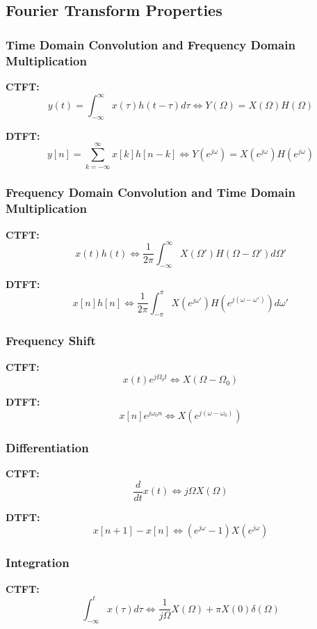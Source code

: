 \documentclass[12pt]{article}
\begin{document}
\subsection{Fourier Transform Properties}

\subsubsection{Time Domain Convolution and Frequency Domain Multiplication}

\textbf{CTFT:}
\[
y(t) = \int_{-\infty}^{\infty} x(\tau) h(t - \tau) d\tau \iff Y(\Omega) = X(\Omega) H(\Omega)
\]

\textbf{DTFT:}
\[
y[n] = \sum_{k=-\infty}^{\infty} x[k] h[n - k] \iff Y(e^{j\omega}) = X(e^{j\omega}) H(e^{j\omega})
\]

\subsubsection{Frequency Domain Convolution and Time Domain Multiplication}

\textbf{CTFT:}
\[
x(t)h(t) \iff \frac{1}{2\pi} \int_{-\infty}^{\infty} X(\Omega') H(\Omega - \Omega') d\Omega'
\]

\textbf{DTFT:}
\[
x[n]h[n] \iff \frac{1}{2\pi} \int_{-\pi}^{\pi} X(e^{j\omega'}) H(e^{j(\omega - \omega')}) d\omega'
\]

\subsubsection{Frequency Shift}

\textbf{CTFT:}
\[
x(t)e^{j \Omega_0 t} \iff X(\Omega - \Omega_0)
\]

\textbf{DTFT:}
\[
x[n]e^{j \omega_0 n} \iff X(e^{j(\omega - \omega_0)})
\]

\subsubsection{Differentiation}

\textbf{CTFT:}
\[
\frac{d}{dt}x(t) \iff j \Omega X(\Omega)
\]

\textbf{DTFT:}
\[
x[n+1] - x[n] \iff (e^{j\omega} - 1) X(e^{j\omega})
\]

\subsubsection{Integration}

\textbf{CTFT:}
\[
\int_{-\infty}^{t} x(\tau) d\tau \iff \frac{1}{j \Omega} X(\Omega) + \pi X(0) \delta(\Omega)
\]
\end{document}

